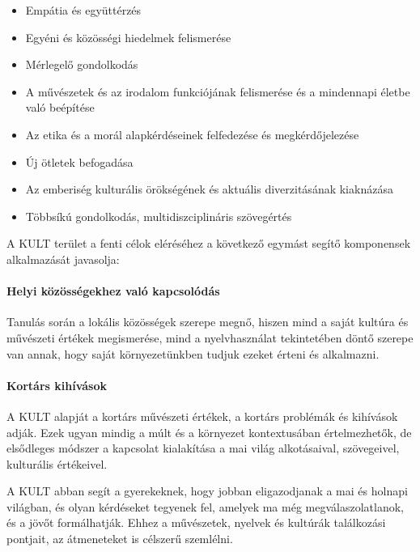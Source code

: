 \begin{itemize}
\tightlist
\item
  Empátia és együttérzés
\item
  Egyéni és közösségi hiedelmek felismerése
\item
  Mérlegelő gondolkodás
\item
  A művészetek és az irodalom funkciójának felismerése és a mindennapi
  életbe való beépítése
\item
  Az etika és a morál alapkérdéseinek felfedezése és megkérdőjelezése
\item
  Új ötletek befogadása
\item
  Az emberiség kulturális örökségének és aktuális diverzitásának
  kiaknázása
\item
  Többsíkú gondolkodás, multidiszciplináris szövegértés
\end{itemize}

A KULT terület a fenti célok eléréséhez a következő egymást segítő
komponensek alkalmazását javasolja:

\hypertarget{helyi-kozossegekhez-valo-kapcsolodas}{%
\paragraph{Helyi közösségekhez való
kapcsolódás}\label{helyi-kozossegekhez-valo-kapcsolodas}}

Tanulás során a lokális közösségek szerepe megnő, hiszen mind a saját
kultúra és művészeti értékek megismerése, mind a nyelvhasználat
tekintetében döntő szerepe van annak, hogy saját környezetünkben tudjuk
ezeket érteni és alkalmazni.

\hypertarget{kortars-kihivasok}{%
\paragraph{Kortárs kihívások}\label{kortars-kihivasok}}

A KULT alapját a kortárs művészeti értékek, a kortárs problémák és
kihívások adják. Ezek ugyan mindig a múlt és a környezet kontextusában
értelmezhetők, de elsődleges módszer a kapcsolat kialakítása a mai világ
alkotásaival, szövegeivel, kulturális értékeivel.

A KULT abban segít a gyerekeknek, hogy jobban eligazodjanak a mai és
holnapi világban, és olyan kérdéseket tegyenek fel, amelyek ma még
megválaszolatlanok, és a jövőt formálhatják. Ehhez a művészetek, nyelvek
és kultúrák találkozási pontjait, az átmeneteket is célszerű szemlélni.

